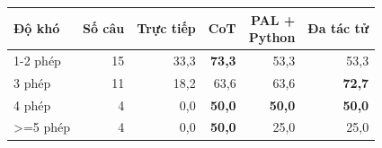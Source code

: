 \begin{tabular}{lrrrrr}
\toprule
Độ khó & Số câu & Trực tiếp & CoT & \makecell[r]{PAL +\\Python} & Đa tác tử \\
\midrule
1-2 phép & 15 & 33{,}3 & \textbf{73{,}3} & 53{,}3 & 53{,}3 \\
3 phép & 11 & 18{,}2 & 63{,}6 & 63{,}6 & \textbf{72{,}7} \\
4 phép & 4 & 0{,}0 & \textbf{50{,}0} & \textbf{50{,}0} & \textbf{50{,}0} \\
>=5 phép & 4 & 0{,}0 & \textbf{50{,}0} & 25{,}0 & 25{,}0 \\
\bottomrule
\end{tabular}
